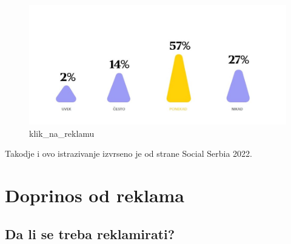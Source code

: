 \documentclass[a4paper]{article}
\begin{document}
	\begin{figure}[h!]
		\begin{center}
			\includegraphics[scale=0.75]{klik_na_reklamu.jpg}
		\end{center}
		\caption{klik_na_reklamu}
		\label{fig:klik_na_reklamu}
	\end{figure}
	Takodje i ovo istrazivanje izvrseno je od strane Social Serbia 2022.
	\section{Doprinos od reklama}
	\label{sec:doprinos}
	\subsection{Da li se treba reklamirati?}
	\label{subsec:potrebna_reklama}
	
\end{document}
